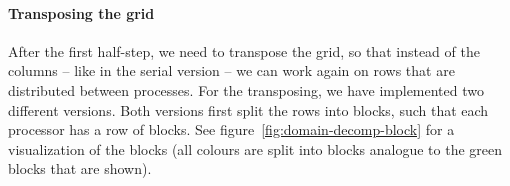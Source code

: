 \documentclass[a4paper]{article}
\begin{document}
\paragraph{Transposing the grid}\label{sec:transposing}
After the first half-step, we need to transpose the grid, so that instead of the columns -- like in the serial version -- we can work again on rows that are distributed between processes.
For the transposing, we have implemented two different versions.
Both versions first split the rows into blocks, such that each processor has a row of blocks.
See figure~\ref{fig:domain-decomp-block} for a visualization of the blocks (all colours are split into blocks analogue to the green blocks that are shown).
\end{document}
